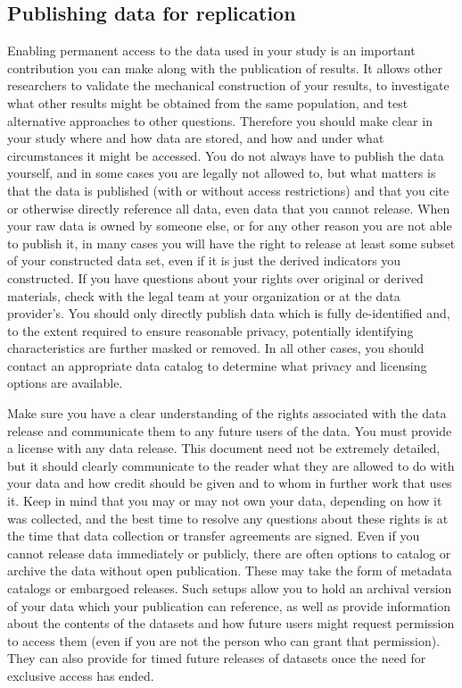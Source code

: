 \subsection{Publishing data for replication}

Enabling permanent access to the data used in your study
is an important contribution you can make along with the publication of results.
It allows other researchers to validate the mechanical construction of your results,
to investigate what other results might be obtained from the same population,
and test alternative approaches to other questions.
Therefore you should make clear in your study
where and how data are stored, and how and under what circumstances it might be accessed.
You do not always have to publish the data yourself,
and in some cases you are legally not allowed to,
but what matters is that the data is published
(with or without access restrictions)
and that you cite or otherwise directly reference all data,
even data that you cannot release.
When your raw data is owned by someone else,
or for any other reason you are not able to publish it,
in many cases you will have the right to release
at least some subset of your constructed data set,
even if it is just the derived indicators you constructed.
If you have questions about your rights over original or derived materials,
check with the legal team at your organization or at the data provider's.
You should only directly publish data which is fully de-identified
and, to the extent required to ensure reasonable privacy,
potentially identifying characteristics are further masked or removed.
In all other cases, you should contact an appropriate data catalog
to determine what privacy and licensing options are available.

Make sure you have a clear understanding of the rights associated with the data release
and communicate them to any future users of the data.
You must provide a license with any data release.
This document need not be extremely detailed,
but it should clearly communicate to the reader what they are allowed to do with your data and
how credit should be given and to whom in further work that uses it.
Keep in mind that you may or may not own your data,
depending on how it was collected,
and the best time to resolve any questions about these rights
is at the time that data collection or transfer agreements are signed.
Even if you cannot release data immediately or publicly,
there are often options to catalog or archive the data without open publication.
These may take the form of metadata catalogs or embargoed releases.
Such setups allow you to hold an archival version of your data
which your publication can reference,
as well as provide information about the contents of the datasets
and how future users might request permission to access them
(even if you are not the person who can grant that permission).
They can also provide for timed future releases of datasets
once the need for exclusive access has ended.


